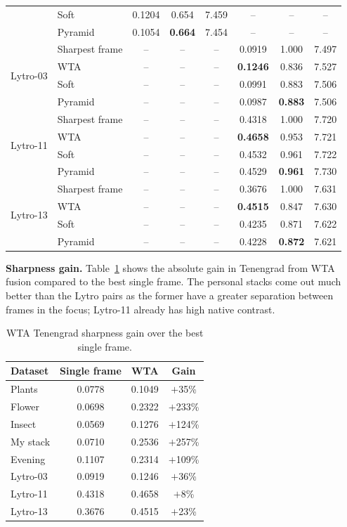 \documentclass[conference]{IEEEtran}
\begin{document}
\begin{table}[t]
\begin{tabular}{llcccccc}
  & Soft           & 0.1204 & 0.654 & 7.459 & -- & -- & -- \\
  & Pyramid        & 0.1054 & \textbf{0.664} & 7.454 & -- & -- & -- \\
\midrule
\multirow{4}{*}{Lytro-03}
  & Sharpest frame & -- & -- & -- & 0.0919 & 1.000 & 7.497 \\
  & WTA            & -- & -- & -- & \textbf{0.1246} & 0.836 & 7.527 \\
  & Soft           & -- & -- & -- & 0.0991 & 0.883 & 7.506 \\
  & Pyramid        & -- & -- & -- & 0.0987 & \textbf{0.883} & 7.506 \\
\midrule
\multirow{4}{*}{Lytro-11}
  & Sharpest frame & -- & -- & -- & 0.4318 & 1.000 & 7.720 \\
  & WTA            & -- & -- & -- & \textbf{0.4658} & 0.953 & 7.721 \\
  & Soft           & -- & -- & -- & 0.4532 & 0.961 & 7.722 \\
  & Pyramid        & -- & -- & -- & 0.4529 & \textbf{0.961} & 7.730 \\
\midrule
\multirow{4}{*}{Lytro-13}
  & Sharpest frame & -- & -- & -- & 0.3676 & 1.000 & 7.631 \\
  & WTA            & -- & -- & -- & \textbf{0.4515} & 0.847 & 7.630 \\
  & Soft           & -- & -- & -- & 0.4235 & 0.871 & 7.622 \\
  & Pyramid        & -- & -- & -- & 0.4228 & \textbf{0.872} & 7.621 \\
\bottomrule
\end{tabular}
\end{table}

\textbf{Sharpness gain.} Table~\ref{tab:gain} shows the absolute gain in Tenengrad from WTA fusion compared to the best single frame. The personal stacks come out much better than the Lytro pairs as the former have a greater separation between frames in the focus; Lytro-11 already has high native contrast.

\begin{table}[!ht]
\centering
\caption{WTA Tenengrad sharpness gain over the best single frame.}
\label{tab:gain}
\begin{tabular}{lccc}
\toprule
Dataset   & Single frame & WTA    & Gain \\
\midrule
Plants    & 0.0778 & 0.1049 & $+$35\% \\
Flower    & 0.0698 & 0.2322 & $+$233\% \\
Insect    & 0.0569 & 0.1276 & $+$124\% \\
My stack  & 0.0710 & 0.2536 & $+$257\% \\
Evening   & 0.1107 & 0.2314 & $+$109\% \\
Lytro-03  & 0.0919 & 0.1246 & $+$36\% \\
Lytro-11  & 0.4318 & 0.4658 & $+$8\%  \\
Lytro-13  & 0.3676 & 0.4515 & $+$23\% \\
\bottomrule
\end{tabular}
\end{table}
\end{document}
